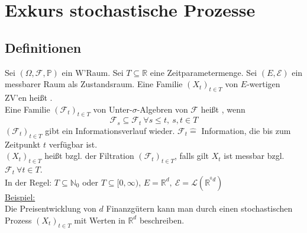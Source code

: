 \section{Exkurs stochastische Prozesse}
\label{sec:stoch_prozesse}

\subsection{Definitionen}
\label{sub:def}
Sei $(\Omega,\mathcal{F},\mathds{P})$ ein W'Raum. 
Sei $T\subseteq \mathds{R}$ eine Zeitparametermenge. 
Sei $(E,\mathcal{E})$ ein messbarer Raum als Zustandsraum. Eine Familie $(X_t)_{t \in T}$ von $E$-wertigen ZV'en heißt .\\
Eine Familie $(\mathcal{F}_t)_{t\in T}$ von Unter-$\sigma$-Algebren von $\mathcal{F}$ heißt , wenn 
\[
\mathcal{F}_s\subseteq \mathcal{F}_t~\forall s\le t,~s,t\in T
\]
$(\mathcal{F}_t)_{t\in T}$ gibt ein Informationsverlauf wieder. $\mathcal{F}_t \mathrel{\hat{=}}$ Information, die bis zum Zeitpunkt $t$ verfügbar ist.\\
$(X_t)_{t\in T}$ heißt  bzgl. der Filtration $(\mathcal{F}_t)_{t\in T}$, falls gilt $X_t$ ist messbar bzgl. $\mathcal{F}_t~\forall t\in T$.\\ 
In der Regel: $T\subseteq \mathds{N}_0$ oder $T\subseteq [0,\infty)$, $E=\mathds{R}^d,~\mathcal{E}=\mathcal{L}(\mathds{R}^{^0d})$\\

\uline{Beispiel:}\\
Die Preisentwicklung von $d$ Finanzgütern kann man durch einen stochastischen Prozess $(X_t)_{t\in T}$ mit Werten in $\mathds{R}^d$ beschreiben.


